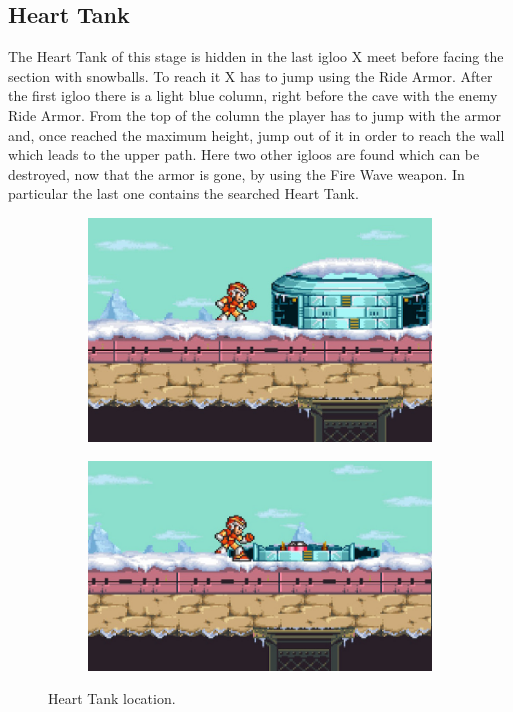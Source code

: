 \subsection{Heart Tank}\label{Penguin:heart_tank}
The Heart Tank of this stage is hidden in the last igloo X meet before facing the section with snowballs. To reach it X has to jump using the Ride Armor. After the first igloo there is a light blue column, right before the cave with the enemy Ride Armor. From the top of the column the player has to jump with the armor and, once reached the maximum height, jump out of it in order to reach the wall which leads to the upper path. Here two other igloos are found which can be destroyed, now that the armor is gone, by using the Fire Wave weapon. In particular the last one contains the searched Heart Tank.
\begin{figure}[htp]
	\centering
	\begin{subfigure}{0.375\linewidth}
		\centering
		\includegraphics[width=\textwidth]{figures/X1/Chill_penguin/Chill_heart_1.jpg}	
		\caption{}
	\end{subfigure}
	\begin{subfigure}{0.4\linewidth}
		\centering
		\includegraphics[width=\textwidth]{figures/X1/Chill_penguin/Chill_heart_2.jpg}	
		\caption{}
	\end{subfigure}
	\caption{Heart Tank location.}
\end{figure}

